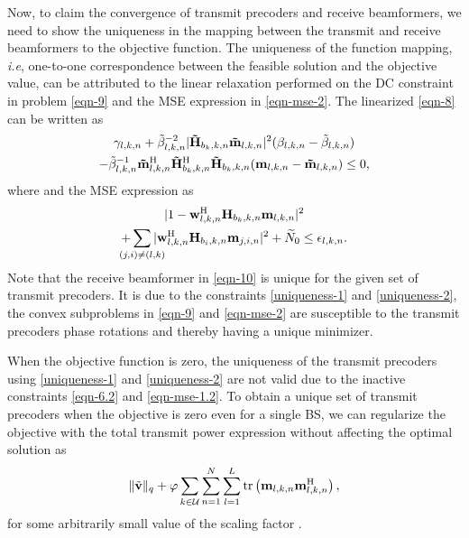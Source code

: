 Now, to claim the convergence of transmit precoders and receive beamformers, we need to show the uniqueness in the mapping between the transmit and receive beamformers to the objective function. The uniqueness of the function mapping, \textit{i.e}, one-to-one correspondence between the feasible solution and the objective value, can be attributed to the linear relaxation performed on the \ac{DC} constraint in problem \eqref{eqn-9} and the \ac{MSE} expression in \eqref{eqn-mse-2}. The linearized \eqref{eqn-8} can be written as
\begin{multline} \label{uniqueness-1}
\gamma_{l,k,n} + \tilde{\beta}_{l,k,n}^{-2} |\mvec{\tilde{H}}{b_k,k,n} \mvec{\tilde{m}}{l,k,n}|^2 (\beta_{l,k,n} - \tilde{\beta}_{l,k,n}) \\
- \tilde{\beta}_{l,k,n}^{-1} \mvec{\tilde{m}}{l,k,n}^\herm \mvec{\tilde{H}}{b_k,k,n}^\herm \mvec{\tilde{H}}{b_k,k,n} (\mvec{m}{l,k,n} - \mvec{\tilde{m}}{l,k,n}) \leq 0,
\end{multline}
where  and the \ac{MSE} expression as
\begin{multline} \label{uniqueness-2}
| 1 - \mvec{w}{l,k,n}^\herm \mvec{H}{b_k,k,n} \mvec{m}{l,k,n} |^2 \\ + \sum_{\mathclap{(j,i) \neq (l,k)}} | \mvec{w}{l,k,n}^\herm \mvec{H}{b_i,k,n} \mvec{m}{j,i,n} |^2 + \enoise \leq \epsilon_{l,k,n}.
\end{multline}
Note that the receive beamformer  in \eqref{eqn-10} is unique for the given set of transmit precoders. It is due to the constraints \eqref{uniqueness-1} and \eqref{uniqueness-2}, the convex subproblems in \eqref{eqn-9} and \eqref{eqn-mse-2} are susceptible to the transmit precoders phase rotations and thereby having a unique minimizer. 

When the objective function is zero, the uniqueness of the transmit precoders using \eqref{uniqueness-1} and \eqref{uniqueness-2} are not valid due to the inactive constraints \eqref{eqn-6.2} and \eqref{eqn-mse-1.2}. To obtain a unique set of transmit precoders when the objective is zero even for a single \ac{BS}, we can regularize the objective with the total transmit power expression without affecting the optimal solution as 
\begin{equation*}
\| \tilde{\mathbf{v}} \|_q + \varphi \sum_{k \in \mathcal{U}} \sum_{n = 1}^{N} \sum_{l=1}^{L} \mathrm{tr} \left ( \mathbf{m}_{l,k,n} \mathbf{m}^{\mathrm{H}}_{l,k,n} \right ),
\end{equation*}
for some arbitrarily small value of the scaling factor . 

